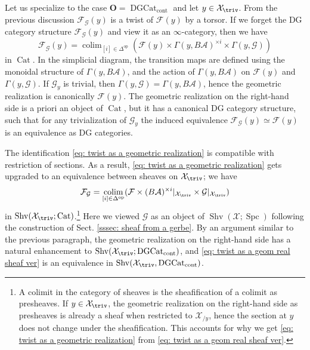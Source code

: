 \documentclass[10pt]{amsart}
\newcommand{\sssec}{\subsubsection}
\theoremstyle{remark}
\newcommand{\on}{\operatorname}
\newcommand{\cA}{\mathcal{A}}
\newcommand{\cF}{\mathcal{F}}
\newcommand{\cG}{\mathcal{G}}
\newcommand{\cX}{\mathcal{X}}
\newcommand{\Cat}{\on{Cat}}
\newcommand{\DGcat}{\on{DGCat}_{\on{cont}}}
\newcommand{\Shv}{\on{Shv}}
\newcommand{\Spc}{\on{Spc}}
\DeclareMathOperator{\op}{op}
\DeclareMathOperator{\colim}{colim}
\newcommand{\bO}{\mathbf{O}}
\begin{document}
\sssec{}
Let us specialize to the case $\bO=\DGcat$ and let $y\in\cX_{\triv}$. From the previous discussion $\cF_{\cG}(y)$ is a twist of $\cF(y)$ by a torsor. If we forget the DG category structure $\cF_{\cG}(y)$ and view it as an $\infty$-category, then we have
\begin{equation}\label{eq: twist as a geometric realization}
    \cF_{\cG}(y)= \colim_{[i]\in \Delta^{\op}} \left(\cF(y)\times \Gamma(y,B\cA)^{\times i}\times \Gamma(y,\cG)\right)
\end{equation}
in $\Cat$. In the simplicial diagram, the transition maps are defined using the monoidal structure of $\Gamma(y,B\cA)$, and the action of $\Gamma(y,B\cA)$ on $\cF(y)$ and $\Gamma(y,\cG)$. If $\cG_y$ is trivial, then $\Gamma(y,\cG)=\Gamma(y,B\cA)$, hence the geometric realization is canonically $\cF(y)$.
The geometric realization on the right-hand side is a priori an object of $\Cat$, but it has a canonical DG category structure, such that for any trivialization of $\cG_y$ the induced equivalence $\cF_{\cG}(y)\simeq \cF(y)$ is an equivalence as DG categories. 
\medskip

The identification \eqref{eq: twist as a geometric realization} is compatible with restriction of sections. As a result, \eqref{eq: twist as a geometric realization} gets upgraded to an equivalence between sheaves on $\cX_{\triv}$; we have
\begin{equation}\label{eq: twist as a geom real sheaf ver}
    \cF_{\cG}= \colim_{[i]\in \Delta^{\op}} (\cF\times (B\cA)^{\times i}|_{\cX_{\triv}}\times \cG|_{\cX_{\triv}})
\end{equation}
in $\Shv(\cX_{\triv};\Cat)$.\footnote{A colimit in the category of sheaves is the sheafification of a colimit as presheaves. If $y\in\cX_{\triv}$, the geometric realization on the right-hand side as presheaves is already a sheaf when restricted to $\cX_{/y}$, hence the section at $y$ does not change under the sheafification. This accounts for why we get \eqref{eq: twist as a geometric realization} from \eqref{eq: twist as a geom real sheaf ver}.} Here we viewed $\cG$ as an object of $\Shv(\cX;\Spc)$ following the construction of Sect. \ref{sssec: sheaf from a gerbe}. By an argument similar to the previous paragraph, the geometric realization on the right-hand side has a natural enhancement to $\Shv(\cX_{\triv};\DGcat)$, and \eqref{eq: twist as a geom real sheaf ver} is an equivalence in $\Shv(\cX_{\triv},\DGcat)$.
\end{document}
